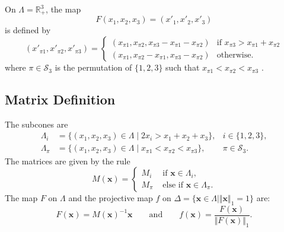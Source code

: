 On $\Lambda=\mathbb{R}^3_+$, the map
\[
F (x_1,x_2,x_3) = (x'_1,x'_2,x'_3)
\]
is defined by
\[
(x'_{\pi 1}, x'_{\pi 2}, x'_{\pi 3}) =
\begin{cases}
    (x_{\pi 1}, x_{\pi 2}, x_{\pi 3}-x_{\pi 1}-x_{\pi 2}) &\mbox{if }
	x_{\pi 3}>x_{\pi 1}+x_{\pi 2}\\
    (x_{\pi 1}, x_{\pi 2}-x_{\pi 1}, x_{\pi 3}-x_{\pi 2}) &\mbox{otherwise.}
\end{cases}
\]
where $\pi\in\mathcal{S}_3$ is the permutation of $\{1,2,3\}$ such that
$x_{\pi 1}<x_{\pi 2}<x_{\pi 3}$ \cite{2015_berthe_factor}.
\subsection{Matrix Definition}
The subcones are
\begin{align*}
	\Lambda_i &= \{(x_1,x_2,x_3)\in\Lambda\mid 
	2x_i > x_1+x_2+x_3\},
	&i\in\{1,2,3\},\\
    \Lambda_\pi &= \{(x_1,x_2,x_3)\in\Lambda\mid 
	x_{\pi 1}< x_{\pi 2}< x_{\pi 3}\},
	&\pi\in\mathcal{S}_3.
\end{align*}
The matrices are given by the rule
\[
    M(\mathbf{x}) =
\begin{cases}
    M_i    & \text{ if } \mathbf{x} \in \Lambda_i,\\
    M_\pi  & \text{ else if } \mathbf{x} \in \Lambda_\pi.
\end{cases}
\]
The map $F$ on $\Lambda$ and
the projective map $f$ on
$\Delta=\{\mathbf{x}\in\Lambda\mid\Vert\mathbf{x}\Vert_1=1\}$ are:
\[
    F(\mathbf{x}) = M(\mathbf{x})^{-1}\mathbf{x}
    \qquad\text{and}\qquad
    f(\mathbf{x}) = \frac{F(\mathbf{x})}{\Vert F(\mathbf{x})\Vert_1}.
\]
